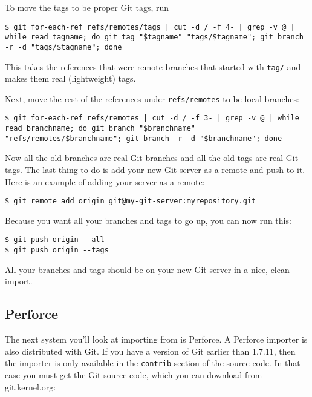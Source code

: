 \documentclass[a4paper]{book}
\begin{document}
To move the tags to be proper Git tags, run

\begin{shaded}\begin{verbatim}
$ git for-each-ref refs/remotes/tags | cut -d / -f 4- | grep -v @ | while read tagname; do git tag "$tagname" "tags/$tagname"; git branch -r -d "tags/$tagname"; done
\end{verbatim}\end{shaded}

This takes the references that were remote branches that started with \texttt{tag/} and makes them real (lightweight) tags.

Next, move the rest of the references under \texttt{refs/remotes} to be local branches:

\begin{shaded}\begin{verbatim}
$ git for-each-ref refs/remotes | cut -d / -f 3- | grep -v @ | while read branchname; do git branch "$branchname" "refs/remotes/$branchname"; git branch -r -d "$branchname"; done
\end{verbatim}\end{shaded}

Now all the old branches are real Git branches and all the old tags are real Git tags. The last thing to do is add your new Git server as a remote and push to it. Here is an example of adding your server as a remote:

\begin{shaded}\begin{verbatim}
$ git remote add origin git@my-git-server:myrepository.git
\end{verbatim}\end{shaded}

Because you want all your branches and tags to go up, you can now run this:

\begin{shaded}\begin{verbatim}
$ git push origin --all
$ git push origin --tags
\end{verbatim}\end{shaded}

All your branches and tags should be on your new Git server in a nice, clean import.

\subsection{Perforce}

The next system you'll look at importing from is Perforce. A Perforce importer is also distributed with Git. If you have a version of Git earlier than 1.7.11, then the importer is only available in the \texttt{contrib} section of the source code. In that case you must get the Git source code, which you can download from git.kernel.org:
\end{document}
